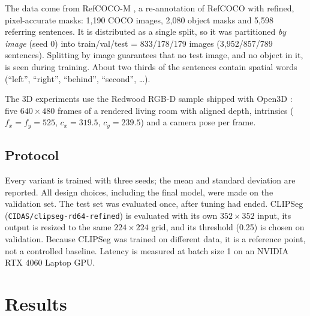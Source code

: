 \documentclass[conference,a4paper]{IEEEtran}
\begin{document}
The data come from RefCOCO-M \cite{refcocom}, a re-annotation of RefCOCO \cite{yu2016refcoco} with refined,
pixel-accurate masks: 1,190 COCO images, 2,080 object masks and 5,598 referring sentences. It is
distributed as a single split, so it was partitioned \emph{by image} (seed 0) into
train/val/test = 833/178/179 images (3,952/857/789 sentences). Splitting by image guarantees that no
test image, and no object in it, is seen during training. About two thirds of the sentences
contain spatial words (\enquote{left}, \enquote{right}, \enquote{behind}, \enquote{second}, \dots).

The 3D experiments use the Redwood RGB-D sample shipped with Open3D \cite{choi2015redwood}:
five $640\times480$ frames of a rendered living room with aligned depth, intrinsics
($f_x = f_y = 525$, $c_x = 319.5$, $c_y = 239.5$) and a camera pose per frame.

\subsection{Protocol}

Every variant is trained with three seeds; the mean and standard deviation are reported. All design
choices, including the final model, were made on the validation set. The test set was evaluated
once, after tuning had ended. CLIPSeg (\texttt{CIDAS/clipseg-rd64-refined}) is evaluated with its
own $352\times352$ input, its output is resized to the same $224\times224$ grid, and its threshold
(0.25) is chosen on validation. Because CLIPSeg was trained on different data, it is a reference
point, not a controlled baseline. Latency is measured at batch size 1 on an NVIDIA RTX 4060 Laptop GPU.

\section{Results}
\label{sec:results}
\end{document}
